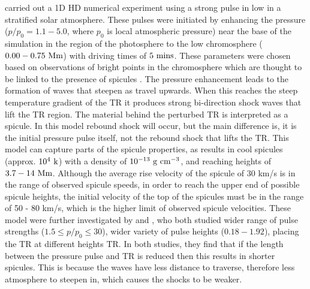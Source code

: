 \documentclass[12pt]{ociamthesis}
\newcommand{\np}{\\ \\}
\begin{document}
%
\cite{Suematsu1982SoPh7599S} carried out a 1D HD numerical experiment using a strong pulse in low in a stratified solar atmosphere. These pulses were initiated by enhancing the pressure ($p/p_0=1.1-5.0$, where $p_0$ is local atmospheric pressure) near the base of the simulation in the region of the photosphere to the low chromosphere ($0.00-0.75~\rm{Mm}$) with driving times of $5~\rm{mins}$. These parameters were chosen based on observations of bright points in the chromosphere which are thought to be linked to the presence of spicules \citep{Suematsu1995ApJ, Jess2012ApJ744L5J, Oxley_2020ApJ905168O}. The pressure enhancement leads to the formation of waves that steepen as travel upwards. When this reaches the steep temperature gradient of the TR it produces strong bi-direction shock waves that lift the TR region. The material behind the perturbed TR is interpreted as a spicule. In this model rebound shock will occur, but the main difference is, it is the initial pressure pulse itself, not the rebound shock that lifts the TR. This model can capture parts of the spicule properties, as results in cool spicules (approx. $10^4~\rm{k}$) with a density of $10^{-13}~\rm{g~cm^{-3}}$, and reaching heights of $3.7-14~\rm{Mm}$. Although the average rise velocity of the spicule of 30 km/s  is in the range of observed spicule speeds, in order to reach the upper end of possible spicule heights, the initial velocity of the top of the spicules must be in the range of 50 - 80 km/s, which is the higher limit of observed spicule velocities. These model were further investigated by \cite{Shibata1982SoPh78333S} and \cite{Shibata1982}, who both studied wider range of pulse strengths ($1.5 \le p/p_0 \le 30$), wider variety of pulse heights ($0.18-1.92$), placing the TR at different heights TR. In both studies, they find that if the length between the pressure pulse and TR is reduced then this results in shorter spicules. This is because the waves have less distance to traverse, therefore less atmosphere to steepen in, which causes the shocks to be weaker. \np
%
\end{document}
